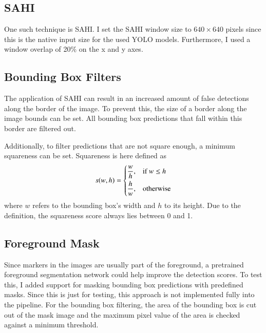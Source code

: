 \documentclass[10pt]{book}
\begin{document}
\subsection{SAHI}

One such technique is \ac{SAHI}. 
I set the \ac{SAHI} window size to $640 \times 640$ pixels since this is the native input size for the used \ac{YOLO} models. Furthermore, I used a window overlap of 20\% on the x and y axes.

\subsection{Bounding Box Filters}

The application of \ac{SAHI} can result in an increased amount of false detections along the border of the image. To prevent this, the size of a border along the image bounds can be set. All bounding box predictions that fall within this border are filtered out. 

Additionally, to filter predictions that are not square enough, %
a minimum squareness can be set. Squareness is here defined as $$ 
s(w,h)=
\begin{dcases}
    \frac{w}{h}, & \text{if } w\leq h\\
    \frac{h}{w}, & \text{otherwise}
\end{dcases} $$ where $w$ refers to the bounding box's width and $h$ to its height. Due to the definition, the squareness score always lies between 0 and 1.

\subsection{Foreground Mask}

Since markers in the images are usually part of the foreground, a pretrained foreground segmentation network could help improve the detection scores.
To test this, I added support for masking bounding box predictions with predefined masks. Since this is just for testing, this approach is not implemented fully into the pipeline. For the bounding box filtering, the area of the bounding box is cut out of the mask image and the maximum pixel value of the area is checked against a minimum threshold. %
\end{document}
